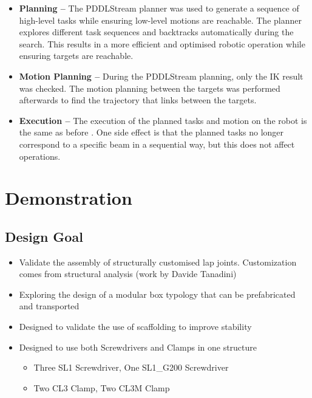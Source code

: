 \begin{itemize}
	\item \textbf{Planning --} The PDDLStream planner was used to generate a sequence of high-level tasks while ensuring low-level motions are reachable. The planner explores different task sequences and backtracks automatically during the search. This results in a more efficient and optimised robotic operation while ensuring targets are reachable.

	\item \textbf{Motion Planning --} During the PDDLStream planning, only the IK result was checked. The motion planning between the targets was performed afterwards to find the trajectory that links between the targets.

	\item \textbf{Execution --} The execution of the planned tasks and motion on the robot is the same as before . One side effect is that the planned tasks no longer correspond to a specific beam in a sequential way, but this does not affect operations.

\end{itemize}
\section{Demonstration}
\label{section:exploration-5-demonstration}

\subsection{Design Goal}
\label{subsection:exploration-5-design-goal}

\begin{itemize}
	\item Validate the assembly of structurally customised lap joints. Customization comes from structural analysis (work by Davide Tanadini)

	\item Exploring the design of a modular box typology that can be prefabricated and transported

	\item Designed to validate the use of scaffolding to improve stability

	\item Designed to use both Screwdrivers and Clamps in one structure

\begin{itemize}
	\item Three SL1 Screwdriver, One SL1\_G200 Screwdriver

	\item Two CL3 Clamp, Two CL3M Clamp

\end{itemize}
\end{itemize}

